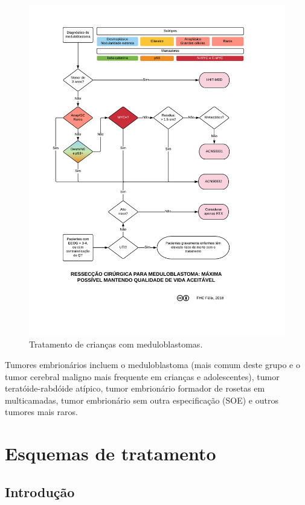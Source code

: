 \documentclass[11pt,a4paper,oldfontcommands]{memoir}
\begin{document}
\begin{figure}[!htb]
\includegraphics[scale=0.87,trim = 18mm 28mm 15mm 12mm,clip]{fig/fig5.pdf}
\caption{Tratamento de crianças com meduloblastomas.}
\end{figure}

Tumores embrionários incluem o meduloblastoma (mais comum deste grupo e o tumor cerebral maligno mais frequente em crianças e adolescentes), tumor teratóide-rabdóide atípico, tumor embrionário formador de rosetas em multicamadas, tumor embrionário sem outra especificação (SOE) e outros tumores mais raros. 

\chapter{Esquemas de tratamento}

\section{Introdução}
\end{document}

